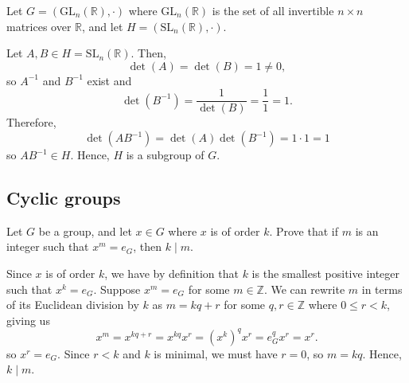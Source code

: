 \begin{exer}
Let $ G=(\mathrm{GL}_n(\mathbb{R}),\cdot) $ where $ \mathrm{GL}_n(\mathbb{R}) $ is the set of all invertible $ n\times n $ matrices over $ \mathbb{R} $, and let $ H=(\mathrm{SL}_n(\mathbb{R}),\cdot) $.
\end{exer}
\begin{sltn}
Let $ A,B\in H=\mathrm{SL}_n(\mathbb{R}) $. Then,
\begin{equation*}
    \det(A)=\det(B)=1\neq 0,
\end{equation*}
so $ A^{-1} $ and $ B^{-1} $ exist and
\begin{equation*}
    \det(B^{-1})=\frac{1}{\det(B)}=\frac{1}{1}=1.
\end{equation*}
Therefore,
\begin{equation*}
    \det(AB^{-1})=\det(A)\det(B^{-1})=1\cdot 1=1
\end{equation*}
so $ AB^{-1}\in H $. Hence, $ H $ is a subgroup of $ G $.
\end{sltn}

\subsection*{Cyclic groups}

\begin{exer}
Let $ G $ be a group, and let $ x\in G $ where $ x $ is of order $ k $. Prove that if $ m $ is an integer such that $ x^m=e_G $, then $ k\mid m $.
\end{exer}
\begin{sltn}
Since $ x $ is of order $ k $, we have by definition that $ k $ is the smallest positive integer such that $ x^k=e_G $. Suppose $ x^m=e_G $ for some $ m\in\mathbb{Z} $. We can rewrite $ m $ in terms of its Euclidean division by $ k $ as $ m=kq+r $ for some $ q,r\in\mathbb{Z} $ where $ 0\leq r<k $, giving us
\begin{equation*}
    x^m=x^{kq+r}=x^{kq}x^r=(x^k)^q x^r=e_G^q x^r=x^r.
\end{equation*}
so $ x^r=e_G $. Since $ r<k $ and $ k $ is minimal, we must have $ r=0 $, so $ m=kq $. Hence, $ k\mid m $.
\end{sltn}
